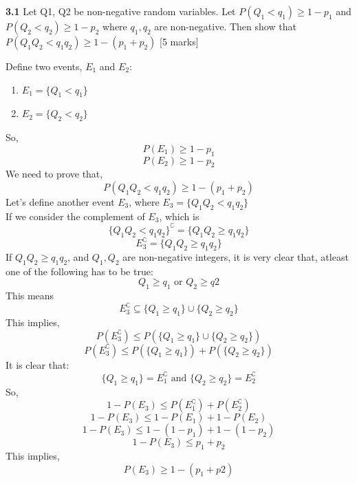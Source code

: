 \begin{que}
	\textbf{3.1} Let Q1, Q2 be non-negative random variables. Let $P(Q_1 < q_1) \geq 1-p_1$ and $P(Q_2 < q_2) \geq 1-p_2$
    where $q_1, q_2$ are non-negative. Then show that $P(Q_1Q_2 < q_1q_2) \geq 1 - (p_1 + p_2)$
	\hspace*{\fill} [5 marks]
\end{que}

\begin{tcolorbox}
	\begin{sol}
        Define two events, $E_1$ and $E_2$: \\
        \begin{enumerate}
            \item $E_1=\{Q_1<q_1\}$
            \item $E_2=\{Q_2<q_2\}$
        \end{enumerate}
        So,
        \[P(E_1)\geq 1-p_1\]
        \[P(E_2)\geq 1-p_2\]
        We need to prove that,
        \[ P(Q_1Q_2 < q_1q_2) \geq 1 - (p_1 + p_2)\]
        Let's define another event $E_3$, where $E_3=\{Q_1Q_2 < q_1q_2\}$\\
        If we consider the complement of $E_3$, which is
        \[\{Q_1Q_2 < q_1q_2\}^\complement=\{Q_1Q_2 \geq q_1q_2\}\]
        \[E_3^\complement=\{Q_1Q_2 \geq q_1q_2\}\]
        \clearpage
        If $Q_1Q_2 \geq q_1q_2$, and $Q_1,Q_2$ are non-negative integers, it is very clear that, atleast one of the following has to be true:
        \[Q_1\geq q_1 \text{ or }Q_2\geq q2 \]
        This means \[E_3^\complement \subseteq \{Q_1\geq q_1\}\cup\{Q_2\geq q_2\} \]
        This implies,
        \[P(E_3^\complement)\leq P(\{Q_1\geq q_1\}\cup\{Q_2\geq q_2\} )\]
        \[P(E_3^\complement)\leq P(\{Q_1\geq q_1\})+P(\{Q_2\geq q_2\} )\]
        It is clear that:
        \[\{Q_1\geq q_1\} = E_1^\complement \text{ and } \{Q_2\geq q_2\} = E_2^\complement\]
        So,         
        \[1-P(E_3)\leq P(E_1^\complement) + P(E_2^\complement)\]
        \[1-P(E_3)\leq 1-P(E_1) + 1-P(E_2)\]
        \[1-P(E_3)\leq 1-(1-p_1) + 1-(1-p_2)\]
        \[1-P(E_3)\leq p_1 +p_2\]
        This implies,
        \[P(E_3)\geq 1-(p_1+p2)\]


    \end{sol}
\end{tcolorbox}
